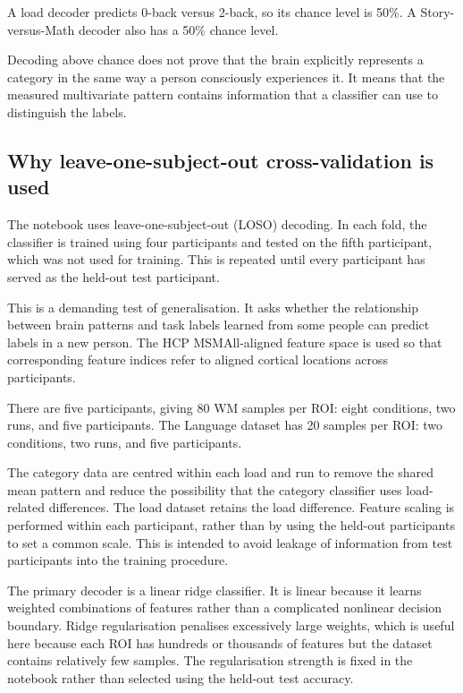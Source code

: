 \documentclass[11pt,a4paper]{article}
\begin{document}
A load decoder predicts 0-back versus 2-back, so its chance level is 50\%. A Story-versus-Math decoder also has a 50\% chance level.

Decoding above chance does not prove that the brain explicitly represents a category in the same way a person consciously experiences it. It means that the measured multivariate pattern contains information that a classifier can use to distinguish the labels.

\subsection{Why leave-one-subject-out cross-validation is used}

The notebook uses leave-one-subject-out (LOSO) decoding. In each fold, the classifier is trained using four participants and tested on the fifth participant, which was not used for training. This is repeated until every participant has served as the held-out test participant.

This is a demanding test of generalisation. It asks whether the relationship between brain patterns and task labels learned from some people can predict labels in a new person. The HCP MSMAll-aligned feature space is used so that corresponding feature indices refer to aligned cortical locations across participants.

There are five participants, giving 80 WM samples per ROI: eight conditions, two runs, and five participants. The Language dataset has 20 samples per ROI: two conditions, two runs, and five participants.

The category data are centred within each load and run to remove the shared mean pattern and reduce the possibility that the category classifier uses load-related differences. The load dataset retains the load difference. Feature scaling is performed within each participant, rather than by using the held-out participants to set a common scale. This is intended to avoid leakage of information from test participants into the training procedure.

The primary decoder is a linear ridge classifier. It is linear because it learns weighted combinations of features rather than a complicated nonlinear decision boundary. Ridge regularisation penalises excessively large weights, which is useful here because each ROI has hundreds or thousands of features but the dataset contains relatively few samples. The regularisation strength is fixed in the notebook rather than selected using the held-out test accuracy.
\end{document}
